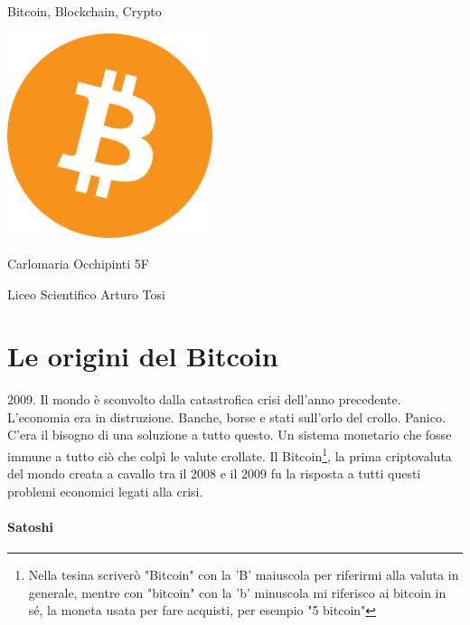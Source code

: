 \documentclass {article}
\begin{document}
\begin{titlepage}

\centering
{\Huge Bitcoin, Blockchain, Crypto\par}
\vfill
\includegraphics [width = 6cm] {logo.png}
\vfill
{\Huge Carlomaria Occhipinti 5F\par}
\vspace{1cm}
{\LARGE Liceo Scientifico Arturo Tosi \par}
\vspace{1cm}

\end{titlepage}


\newpage

\tableofcontents
{}

\newpage


\section {Le origini del Bitcoin}


2009. Il mondo è sconvolto dalla catastrofica crisi dell'anno precedente.
L'economia era in distruzione. Banche, borse e stati sull'orlo del crollo. Panico.
C'era il bisogno di una soluzione a tutto questo. Un sistema monetario che fosse immune a tutto ciò che colpì le valute crollate. Il Bitcoin\footnote{Nella tesina scriverò "Bitcoin" con la 'B' maiuscola per riferirmi alla valuta in generale, mentre con "bitcoin" con la 'b' minuscola mi riferisco ai bitcoin in sé, la moneta usata per fare acquisti, per esempio "5 bitcoin"}, la prima criptovaluta del mondo creata a cavallo tra il 2008 e il 2009 fu la risposta a tutti questi problemi economici legati alla crisi.

\paragraph {Satoshi}
\end{document}
